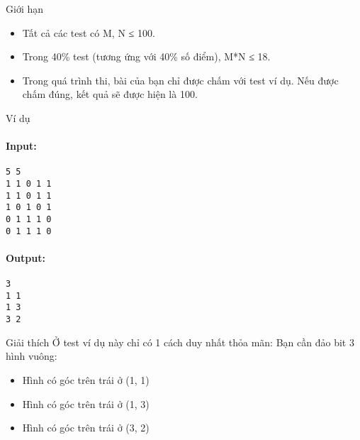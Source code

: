 Giới hạn  
\begin{itemize}
	\item      Tất cả các test có M, N           ≤          100.    
	\item      Trong 40\% test (tương ứng với 40\% số điểm), M*N           ≤          18.    
	\item     Trong quá trình thi, bài của bạn chỉ được chấm với test ví dụ. Nếu được chấm đúng, kết quả sẽ được hiện là 100.   
\end{itemize}
    Ví dụ   
\paragraph{    Input:   }
\begin{verbatim}
5 5
1 1 0 1 1
1 1 0 1 1
1 0 1 0 1
0 1 1 1 0
0 1 1 1 0\end{verbatim}

\paragraph{\textbf{    Output:   }}
\begin{verbatim}
3
1 1
1 3
3 2\end{verbatim}
   Giải thích  
Ở test ví dụ này chỉ có 1 cách duy nhất thỏa mãn: Bạn cần đảo bit 3 hình vuông:  
\begin{itemize}
	\item     Hình có góc trên trái ở (1, 1)   
	\item     Hình có góc trên trái ở (1, 3)   
	\item     Hình có góc trên trái ở (3, 2)   
\end{itemize}